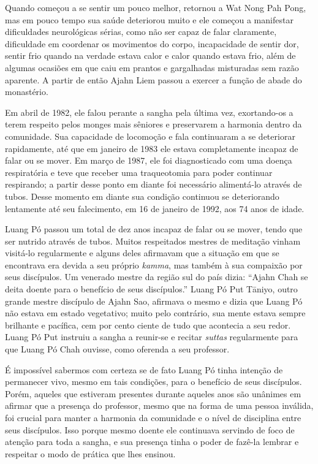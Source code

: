 Quando começou a se sentir um pouco melhor, retornou a Wat Nong Pah
Pong, mas em pouco tempo sua saúde deteriorou muito e ele começou a
manifestar dificuldades neurológicas sérias, como não ser capaz de falar
claramente, dificuldade em coordenar os movimentos do corpo,
incapacidade de sentir dor, sentir frio quando na verdade estava calor e
calor quando estava frio, além de algumas ocasiões em que caiu em
prantos e gargalhadas misturadas sem razão aparente. A partir de então
Ajahn Liem passou a exercer a função de abade do monastério.

Em abril de 1982, ele falou perante a sangha pela última vez,
exortando-os a terem respeito pelos monges mais sêniores e preservarem a
harmonia dentro da comunidade. Sua capacidade de locomoção e fala
continuaram a se deteriorar rapidamente, até que em janeiro de 1983 ele
estava completamente incapaz de falar ou se mover. Em março de 1987, ele
foi diagnosticado com uma doença respiratória e teve que receber uma
traqueotomia para poder continuar respirando; a partir desse ponto em
diante foi necessário alimentá-lo através de tubos. Desse momento em
diante sua condição continuou se deteriorando lentamente até seu
falecimento, em 16 de janeiro de 1992, aos 74 anos de idade.

Luang Pó passou um total de dez anos incapaz de falar ou se mover, tendo
que ser nutrido através de tubos. Muitos respeitados mestres de
meditação vinham visitá-lo regularmente e alguns deles afirmavam que a
situação em que se encontrava era devida a seu próprio \emph{kamma}, mas
também à sua compaixão por seus discípulos. Um venerado mestre da região
sul do país dizia: ``Ajahn Chah se deita doente para o benefício de seus
discípulos.'' Luang Pó Put Tāniyo, outro grande mestre discípulo de
Ajahn Sao, afirmava o mesmo e dizia que Luang Pó não estava em estado
vegetativo; muito pelo contrário, sua mente estava sempre brilhante e
pacífica, cem por cento ciente de tudo que acontecia a seu redor. Luang
Pó Put instruiu a sangha a reunir-se e recitar \emph{suttas}
regularmente para que Luang Pó Chah ouvisse, como oferenda a seu
professor.

É impossível sabermos com certeza se de fato Luang Pó tinha intenção de
permanecer vivo, mesmo em tais condições, para o benefício de seus
discípulos. Porém, aqueles que estiveram presentes durante aqueles anos
são unânimes em afirmar que a presença do professor, mesmo que na forma
de uma pessoa inválida, foi crucial para manter a harmonia da comunidade
e o nível de disciplina entre seus \mbox{discípulos}. Isso porque mesmo doente
ele continuava servindo de foco de atenção para toda a sangha, e sua
presença tinha o poder de fazê-la lembrar e respeitar o modo de prática
que lhes ensinou.

